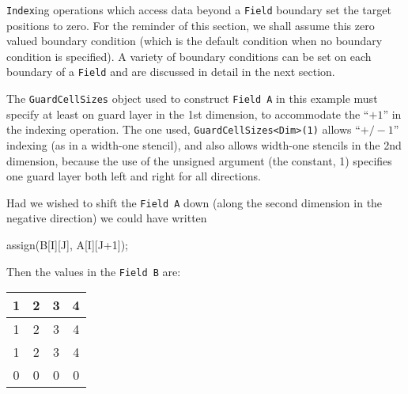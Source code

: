 \texttt{Index}ing operations which access data beyond a \texttt{Field} boundary set the target positions to zero. For the reminder of this section, we shall assume this zero valued boundary condition (which is the default condition when no boundary condition is specified). A variety of boundary conditions can be set on each boundary of a \texttt{Field} and are discussed in detail in the next section.

The \texttt{GuardCellSizes} object used to construct \texttt{Field A} in this example must specify at least on guard layer in the 1st dimension, to accommodate the ``$+1$'' in the indexing operation. The one used, \texttt{GuardCellSizes<Dim>(1)} allows ``$+/-1$'' indexing (as in a width-one stencil), and also allows width-one stencils in the 2nd dimension, because the use of the unsigned argument (the constant, 1) specifies one guard layer both left and right for all directions.

Had we wished to shift the \texttt{Field A} down (along the second dimension in the negative direction) we could have written
\begin{smallcode}
assign(B[I][J], A[I][J+1]);
\end{smallcode}
Then the values in the \texttt{Field B} are:
%
   \begin{center}
        \begin{tabular}{|c|c|c|c|}
        \hline
        1 & 2 & 3 & 4 \\        \hline
        1 & 2 & 3 & 4 \\        \hline
        1 & 2 & 3 & 4 \\        \hline
        0 & 0 & 0 & 0 \\        \hline
        \end{tabular}
   \label{tbl:t2}
   \end{center}

